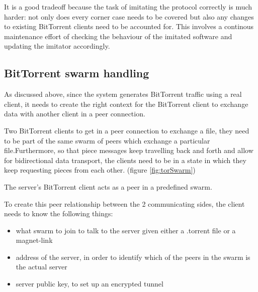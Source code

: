 \documentclass[11pt]{book} %
\begin{document}
It is a good tradeoff because the task of imitating the protocol correctly is much harder: not only does every corner case needs to be covered but also any changes to existing BitTorrent clients need to be accounted for. This involves a continous maintenance effort of checking the behaviour of the imitated software and updating the imitator accordingly.

\subsection{BitTorrent swarm handling}
\label{subsubsec:swarmHandling}

As discussed above, since the system generates BitTorrent traffic using a real client, it needs to create the right context for the BitTorrent client to exchange data with another client in a peer connection.

Two BitTorrent clients to get in a peer connection to exchange a file, they need to be part of the same swarm of peers which exchange a particular file.Furthermore, so that piece messages keep travelling back and forth and allow for bidirectional data transport, the clients need to be in a state in which they keep requesting pieces from each other. (figure \ref{fig:torSwarm})

The server's BitTorrent client acts as a peer in a predefined swarm.

To create this peer relationship between the 2 communicating sides,  the client needs to know the following things:
\begin{itemize}
\item what swarm to join to talk to the server given either a .torrent file or a magnet-link
\item address of the server, in order to identify which of the peers in the swarm is the actual server
\item server public key, to set up an encrypted tunnel
\end{itemize}
\end{document}
